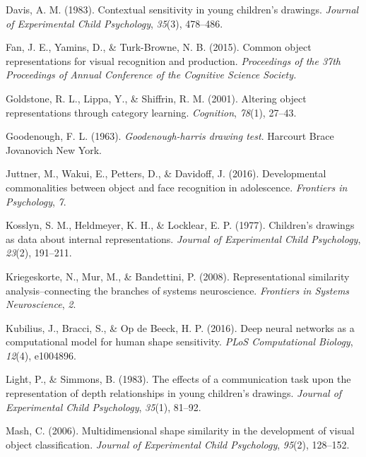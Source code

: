 \documentclass[10pt, letterpaper]{article}
\begin{document}
\setlength{\parindent}{-0.1in} \setlength{\leftskip}{0.125in} \noindent

\hypertarget{refs}{}
\hypertarget{ref-davis1983contextual}{}
Davis, A. M. (1983). Contextual sensitivity in young children's
drawings. \emph{Journal of Experimental Child Psychology}, \emph{35}(3),
478--486.

\hypertarget{ref-fan2015common}{}
Fan, J. E., Yamins, D., \& Turk-Browne, N. B. (2015). Common object
representations for visual recognition and production. \emph{Proceedings
of the 37th Proceedings of Annual Conference of the Cognitive Science
Society.}

\hypertarget{ref-goldstone2001altering}{}
Goldstone, R. L., Lippa, Y., \& Shiffrin, R. M. (2001). Altering object
representations through category learning. \emph{Cognition},
\emph{78}(1), 27--43.

\hypertarget{ref-goodenough1963goodenough}{}
Goodenough, F. L. (1963). \emph{Goodenough-harris drawing test}.
Harcourt Brace Jovanovich New York.

\hypertarget{ref-juttner2016developmental}{}
Juttner, M., Wakui, E., Petters, D., \& Davidoff, J. (2016).
Developmental commonalities between object and face recognition in
adolescence. \emph{Frontiers in Psychology}, \emph{7}.

\hypertarget{ref-kosslyn1977children}{}
Kosslyn, S. M., Heldmeyer, K. H., \& Locklear, E. P. (1977). Children's
drawings as data about internal representations. \emph{Journal of
Experimental Child Psychology}, \emph{23}(2), 191--211.

\hypertarget{ref-kriegeskorte2008RSA}{}
Kriegeskorte, N., Mur, M., \& Bandettini, P. (2008). Representational
similarity analysis--connecting the branches of systems neuroscience.
\emph{Frontiers in Systems Neuroscience}, \emph{2}.

\hypertarget{ref-kubilius2016deep}{}
Kubilius, J., Bracci, S., \& Op de Beeck, H. P. (2016). Deep neural
networks as a computational model for human shape sensitivity.
\emph{PLoS Computational Biology}, \emph{12}(4), e1004896.

\hypertarget{ref-light1983effects}{}
Light, P., \& Simmons, B. (1983). The effects of a communication task
upon the representation of depth relationships in young children's
drawings. \emph{Journal of Experimental Child Psychology}, \emph{35}(1),
81--92.

\hypertarget{ref-mash2006}{}
Mash, C. (2006). Multidimensional shape similarity in the development of
visual object classification. \emph{Journal of Experimental Child
Psychology}, \emph{95}(2), 128--152.
\end{document}
